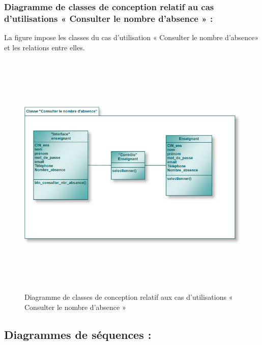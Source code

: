 \documentclass[12 pt ]{report}
\begin{document}
\subsubsection{Diagramme de classes de conception relatif au cas d'utilisations       « Consulter le nombre d'absence » :}
La figure  impose les classes du cas d’utilisation « Consulter le nombre d'absence» et les relations entre elles.
\begin{figure}[h]
 \begin{center}
\includegraphics[width= 18 cm ,height=  12cm]{cl_cna.PNG}
\caption{Diagramme de classes de conception relatif aux cas d'utilisations « Consulter le nombre d'absence » }

\end{center}
\end{figure}
\newpage
\subsection{Diagrammes de séquences :}
\end{document}
